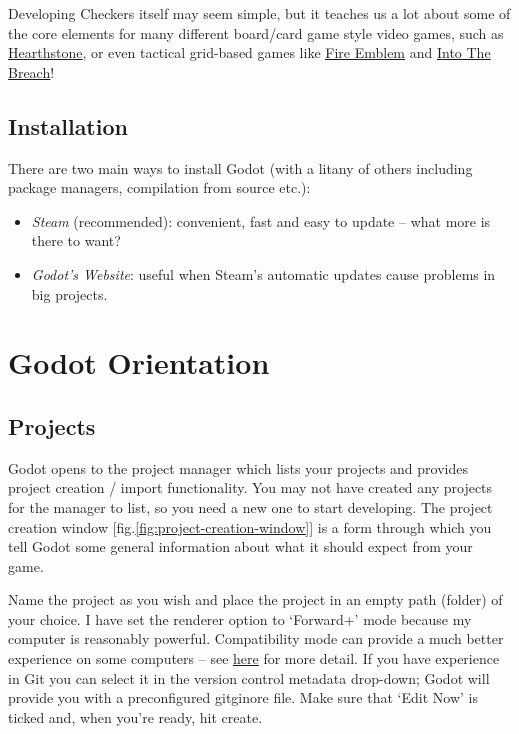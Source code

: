 \documentclass[14pt]{extarticle}
\newcommand{\prettyref}[2]{[{#1}.\ref{#2}]}
\begin{document}
Developing Checkers itself may seem simple, but it teaches us a lot about some of the core elements for many different board/card game style video games, such as \href{https://en.wikipedia.org/wiki/Hearthstone}{\underline{Hearthstone}}, or even tactical grid-based games like \href{https://en.wikipedia.org/wiki/Fire_Emblem}{\underline{Fire Emblem}} and \href{https://store.steampowered.com/app/590380/Into_the_Breach/}{\underline{Into The Breach}}!

\subsection*{Installation}
There are two main ways to install Godot (with a litany of others including package managers, compilation from source etc.):
\begin{itemize}
  \item[--] \emph{Steam} (recommended): convenient, fast and easy to update -- what more is there to want?
  \item[--] \emph{Godot's Website}: useful when Steam's automatic updates cause problems in big projects.
\end{itemize}

\newpage
\section{Godot Orientation}
\subsection*{Projects}
Godot opens to the project manager which lists your projects and provides project creation / import functionality. You may not have created any projects for the manager to list, so you need a new one to start developing. The project creation window \prettyref{fig}{fig:project-creation-window} is a form through which you tell Godot some general information about what it should expect from your game.


Name the project as you wish and place the project in an empty path (folder) of your choice. I have set the renderer option to `Forward+' mode because my computer is reasonably powerful. Compatibility mode can provide a much better experience on some computers -- see \href{https://docs.godotengine.org/en/stable/tutorials/rendering/renderers.html}{\underline{here}} for more detail. If you have experience in Git you can select it in the version control metadata drop-down; Godot will provide you with a preconfigured gitginore file. Make sure that `Edit Now' is ticked and, when you're ready, hit create.
\end{document}
